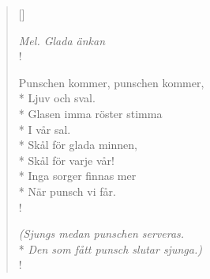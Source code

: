 
\settowidth{\versewidth}{Punschen kommer, punschen kommer,}



\begin{verse}[\versewidth]

\flagverse{}
\emph{Mel. Glada änkan}\\!


Punschen kommer, punschen kommer,\\*
Ljuv och sval.\\*
Glasen imma röster stimma\\*
I vår sal.\\*
Skål för glada minnen,\\*
Skål för varje vår!\\*
Inga sorger finnas mer\\*
När punsch vi får.\\!

\flagverse{}
\emph{(Sjungs medan punschen serveras.}\\* 
\emph{Den som fått punsch slutar sjunga.)}\\!


\end{verse}

